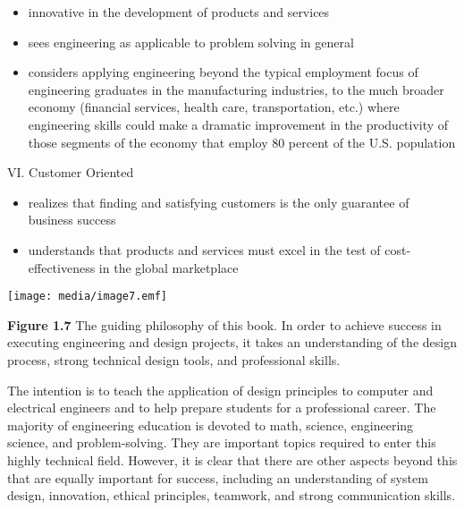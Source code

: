\begin{itemize}
\item
  innovative in the development of products and services
\item
  sees engineering as applicable to problem solving in general
\item
  considers applying engineering beyond the typical employment focus of
  engineering graduates in the manufacturing industries, to the much
  broader economy (financial services, health care, transportation,
  etc.) where engineering skills could make a dramatic improvement in
  the productivity of those segments of the economy that employ 80
  percent of the U.S. population
\end{itemize}

VI. Customer Oriented

\begin{itemize}
\item
  realizes that finding and satisfying customers is the only guarantee
  of business success
\item
  understands that products and services must excel in the test of
  cost-effectiveness in the global marketplace
\end{itemize}

\texttt{[image: media/image7.emf]}

\textbf{Figure 1.7} The guiding philosophy of this book. In order to
achieve success in executing engineering and design projects, it takes
an understanding of the design process, strong technical design tools,
and professional skills.

The intention is to teach the application of design principles to
computer and electrical engineers and to help prepare students for a
professional career. The majority of engineering education is devoted to
math, science, engineering science, and problem-solving. They are
important topics required to enter this highly technical field. However,
it is clear that there are other aspects beyond this that are equally
important for success, including an understanding of system design,
innovation, ethical principles, teamwork, and strong communication
skills.

